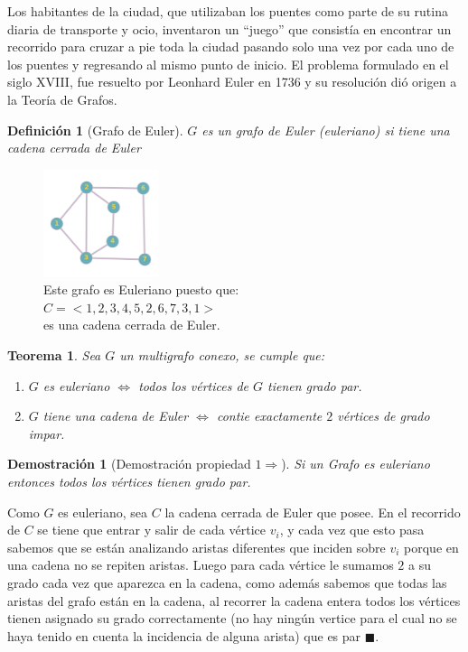 \documentclass[a4paper,1pt]{report}
\newtheorem*{teo}{Teorema}
\newtheorem*{dem}{Demostración}
\newtheorem*{dfn}{Definición}
\begin{document}
Los habitantes de la ciudad, que utilizaban los puentes como parte de su rutina diaria de transporte y ocio, inventaron un ``juego'' que consist\'ia en encontrar un recorrido para cruzar a pie toda la ciudad pasando solo una vez por cada uno de los puentes y regresando al mismo punto de inicio.  
El problema formulado en el siglo XVIII, fue resuelto por Leonhard Euler en 1736 y su resolución dió origen a la Teoría de Grafos.

\begin{dfn}[Grafo de Euler]
$G$ es un grafo de Euler (euleriano) si tiene una cadena cerrada de Euler
\end{dfn}

\begin{figure}
    \caption{Este grafo es Euleriano puesto que: \\$C =<1,2,3,4,5,2,6,7,3,1>$  \\es una cadena cerrada de Euler. \\ }
    \includegraphics[width=0.3\textwidth]{figures3/GrafoEuleriano.png}
\end{figure}


\begin{teo}
Sea $G$ un multigrafo conexo, se cumple que:
\begin{enumerate}
    \item $G$ es euleriano $\Leftrightarrow $ todos los v\'ertices de $G$ tienen grado par.
    \item $G$ tiene una cadena de Euler $\Leftrightarrow$ contie exactamente $2$ v\'ertices de grado impar.
\end{enumerate}
\end{teo}

\begin{dem}[Demostraci\'on propiedad $1 \Rightarrow$] Si un Grafo es euleriano entonces todos los v\'ertices tienen grado par.\end{dem}

Como $G$ es euleriano, sea $C$ la cadena cerrada de Euler que posee. 
En el recorrido de $C$ se tiene que entrar y salir de cada v\'ertice $v_i$, y cada vez que esto pasa sabemos que se est\'an analizando aristas diferentes que inciden sobre $v_i$ porque en una cadena no se repiten aristas. 
Luego para cada v\'ertice le sumamos $2$ a su grado cada vez que aparezca en la cadena, como adem\'as sabemos que todas las aristas del grafo est\'an en la cadena, al recorrer la cadena entera todos los v\'ertices tienen asignado su grado correctamente (no hay ning\'un vertice para el cual no se haya tenido en cuenta la incidencia de alguna arista) que es par $\blacksquare$.
\end{document}
